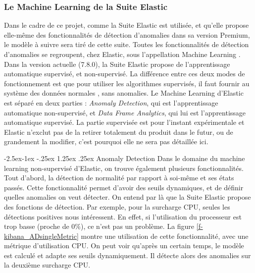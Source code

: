 \documentclass[paper=a4, fontsize=11pt]{scrartcl}
\makeatletter
\renewcommand\paragraph{\@startsection{paragraph}{4}{\z@}%
            {-2.5ex\@plus -1ex \@minus -.25ex}%
            {1.25ex \@plus .25ex}%
            {\normalfont\normalsize\bfseries}}
\makeatother
\begin{document}
\subsubsection{Le Machine Learning de la Suite Elastic}
Dans le cadre de ce projet, comme la Suite Elastic est utilisée, et qu'elle propose elle-même des fonctionnalités de détection d'anomalies dans sa version Premium, le modèle à suivre sera tiré de cette suite. Toutes les fonctionnalités de détection d'anomalies se regroupent, chez Elastic, sous l'appellation \og Machine Learning \fg \cite{noauthor_machine_nodate}. Dans la version actuelle (7.8.0), la Suite Elastic propose de l'apprentissage automatique supervisé, et non-supervisé. La différence entre ces deux modes de fonctionnement est que pour utiliser les algorithmes supervisés, il faut fournir au système des données \og normales \fg, sans anomalies.\newline
Le Machine Learning d'Elastic est séparé en deux parties : \textit{Anomaly Detection}, qui est l'apprentissage automatique non-supervisé, et \textit{Data Frame Analytics}, qui lui est l'apprentissage automatique supervisé. La partie supervisée est pour l'instant expérimentale et Elastic n'exclut pas de la retirer totalement du produit dans le futur, ou de grandement la modifier, c'est pourquoi elle ne sera pas détaillée ici.

\paragraph{Anomaly Detection}
Dans le domaine du machine learning non-supervisé d'Elastic, on trouve également plusieurs fonctionnalités. Tout d'abord, la détection de normalité par rapport à soi-même et ses états passés. Cette fonctionnalité permet d'avoir des seuils dynamiques, et de définir quelles anomalies on veut détecter. On entend par là que la Suite Elastic propose des fonctions de détection. Par exemple, pour la surcharge CPU, seules les détections positives nous intéressent. En effet, si l'utilisation du processeur est trop basse (proche de 0\%), ce n'est pas un problème. La figure \ref{f-kibana_ADsingleMetric} montre une utilisation de cette fonctionnalité, avec une métrique d'utilisation CPU. On peut voir qu'après un certain temps, le modèle est calculé et adapte ses seuils dynamiquement. Il détecte alors des anomalies sur la deuxième surcharge CPU.
\end{document}
